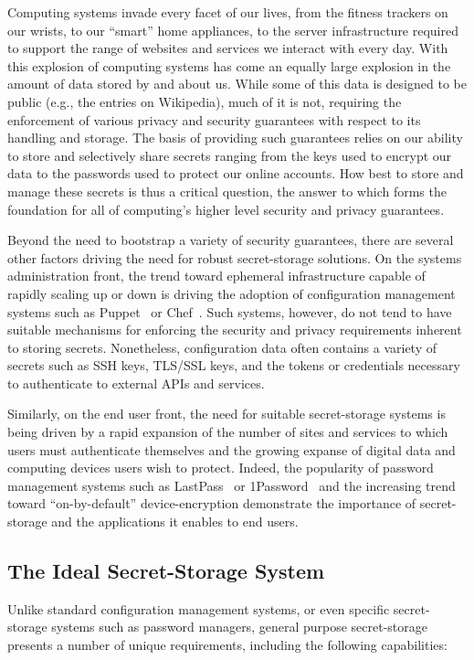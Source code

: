 Computing systems invade every facet of our lives, from the fitness
trackers on our wrists, to our ``smart'' home appliances, to the
server infrastructure required to support the range of websites and
services we interact with every day. With this explosion of computing
systems has come an equally large explosion in the amount of data
stored by and about us. While some of this data is designed to be
public (e.g., the entries on Wikipedia), much of it is not, requiring
the enforcement of various privacy and security guarantees with
respect to its handling and storage. The basis of providing such
guarantees relies on our ability to store and selectively share
secrets ranging from the keys used to encrypt our data to the
passwords used to protect our online accounts. How best to store and
manage these secrets is thus a critical question, the answer to which
forms the foundation for all of computing's higher level security and
privacy guarantees.

Beyond the need to bootstrap a variety of security guarantees, there
are several other factors driving the need for robust secret-storage
solutions. On the systems administration front, the trend toward
ephemeral infrastructure capable of rapidly scaling up or down is
driving the adoption of configuration management systems such as
Puppet~\cite{puppet} or Chef~\cite{chef}. Such systems, however, do
not tend to have suitable mechanisms for enforcing the security and
privacy requirements inherent to storing secrets. Nonetheless,
configuration data often contains a variety of secrets such as SSH
keys, TLS/SSL keys, and the tokens or credentials necessary to
authenticate to external APIs and services.

Similarly, on the end user front, the need for suitable secret-storage
systems is being driven by a rapid expansion of the number of sites
and services to which users must authenticate themselves and the
growing expanse of digital data and computing devices users wish to
protect. Indeed, the popularity of password management systems such as
LastPass~\cite{lastpass} or 1Password~\cite{onepassword} and the
increasing trend toward ``on-by-default'' device-encryption
demonstrate the importance of secret-storage and the applications it
enables to end users.

\subsection{The Ideal Secret-Storage System}

Unlike standard configuration management systems, or even specific
secret-storage systems such as password managers, general purpose
secret-storage presents a number of unique requirements, including the
following capabilities:

